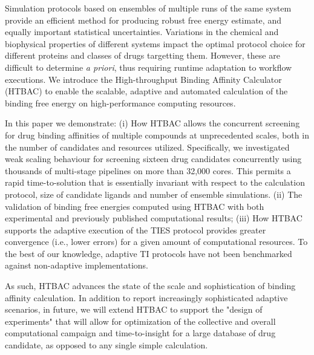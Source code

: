 
Simulation protocols based on ensembles of multiple runs of the same system
provide an efficient method for producing robust free energy estimate, and
equally important statistical uncertainties. Variations in the chemical and
biophysical properties of different systems impact the optimal protocol choice
for different proteins and classes of drugs targetting them. However, these
are difficult to determine {\it a priori}, thus requiring runtime adaptation
to workflow executions. We introduce the High-throughput Binding Affinity
Calculator (HTBAC) to enable the scalable, adaptive and automated calculation
of the binding free energy on high-performance computing resources.

In this paper we demonstrate: (i) How HTBAC allows the concurrent screening
for drug binding affinities of multiple compounds at unprecedented scales,
both in the number of candidates and resources utilized. Specifically, we
investigated weak scaling behaviour for screening sixteen drug candidates
concurrently using thousands of multi-stage pipelines on more than 32,000
cores. This permits a rapid time-to-solution that is essentially invariant
with respect to the calculation protocol, size of candidate ligands and number
of ensemble simulations. (ii) The validation of binding free energies computed
using HTBAC with both experimental and previously published computational
results; (iii) How HTBAC supports the adaptive execution of the TIES protocol
provides greater convergence (i.e., lower errors) for a given amount of
computational resources. To the best of our knowledge, adaptive TI protocols
have not been benchmarked against non-adaptive implementations.





As such, HTBAC advances the state of the scale and sophistication of binding
affinity calculation. In addition to report increasingly sophisticated
adaptive scenarios, in future, we will extend HTBAC to support the "design of
experiments" that will allow for optimization of the collective and overall
computational campaign and time-to-insight for a large database of drug
candidate, as opposed to any single simple calculation.


